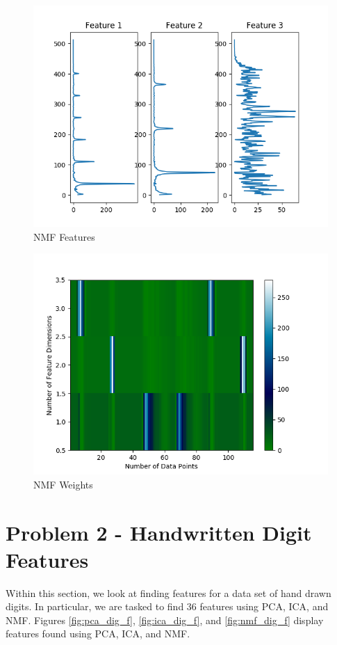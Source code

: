 \documentclass{article}[12pt]
\begin{document}
   \begin{figure}[ht]
   \centerline{
   \includegraphics[scale=1.0]{p1/nmf_features_sound.png}}
   \caption{NMF Features}
   \label{fig:nmf_f}
   \end{figure}
   
   \begin{figure}[ht]
   \centerline{
   \includegraphics[scale=1.0]{p1/nmf_weights_sound.png}}
   \caption{NMF Weights}
   \label{fig:nmf_w}
   \end{figure}
   
   \newpage
   \section{Problem 2 - Handwritten Digit Features}
   Within this section, we look at finding features for a data set of hand drawn digits. In particular, we are tasked to find 36 features using PCA, ICA, and NMF. Figures \ref{fig:pca_dig_f}, \ref{fig:ica_dig_f}, and \ref{fig:nmf_dig_f} display features found using PCA, ICA, and NMF. 
   
\end{document}
